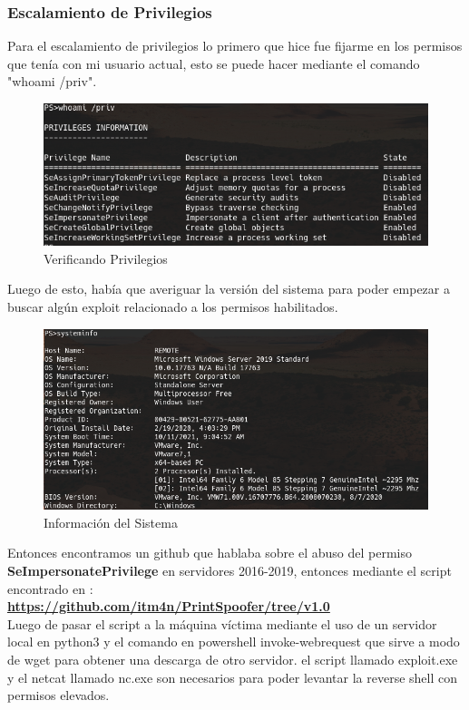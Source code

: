 \documentclass{article}
\begin{document}
\subsubsection{Escalamiento de Privilegios}
Para el escalamiento de privilegios lo primero que hice fue fijarme en los permisos que tenía con mi usuario actual, esto se puede hacer mediante el comando "whoami /priv".
\begin{figure}[h]
	\center
	\includegraphics[width=\textwidth]{images/remote/privilegios.png}
	\caption{Verificando Privilegios}
\end{figure}
Luego de esto, había que averiguar la versión del sistema para poder empezar a buscar algún exploit relacionado a los permisos habilitados.
\begin{figure}[h]
	\center
	\includegraphics[width=\textwidth]{images/remote/systeminfo.png}
	\caption{Información del Sistema}
\end{figure}

\clearpage

Entonces encontramos un github que hablaba sobre el abuso del permiso \textbf{SeImpersonatePrivilege} en servidores 2016-2019, entonces mediante el script encontrado en : \\ \textbf{\href{https://github.com/itm4n/PrintSpoofer/tree/v1.0}{https://github.com/itm4n/PrintSpoofer/tree/v1.0}} 
\\ Luego de pasar el script a la máquina víctima mediante el uso de un servidor local en python3 y el comando en powershell invoke-webrequest que sirve a modo de wget para obtener una descarga de otro servidor.
el script llamado exploit.exe y el netcat llamado nc.exe son necesarios para poder levantar la reverse shell con permisos elevados.
\end{document}
